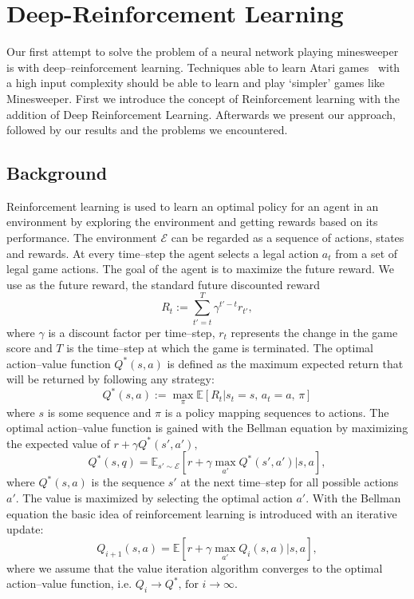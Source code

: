 \chapter{Deep-Reinforcement Learning}
Our first attempt to solve the problem of a neural network playing minesweeper is with deep--reinforcement learning.
Techniques able to learn Atari games~\cite{mnih2013playing} with a high input complexity should be able to learn and play `simpler' games like Minesweeper.
First we introduce the concept of Reinforcement learning with the addition of Deep Reinforcement Learning.
Afterwards we present our approach, followed by our results and the problems we encountered.

\section{Background}
Reinforcement learning is used to learn an optimal policy for an agent in an environment by exploring the environment and getting rewards based on its performance.
The environment $\mathcal{E}$ can be regarded as a sequence of actions, states and rewards.
At every time--step the agent selects a legal action $a_t$ from a set of legal game actions. 
The goal of the agent is to maximize the future reward.
We use as the future reward, the standard future discounted reward
\begin{equation}
R_t := \sum_{t'=t}^T \gamma^{t'-t}r_{t'},
\end{equation}
where $\gamma$ is a discount factor per time--step, $r_t$ represents the change in the game score and $T$ is the time--step at which the game is terminated.
The optimal action--value function $Q^*\left(s,a\right)$ is defined as the maximum expected return that will be returned by following any strategy:
\begin{equation}
Q^*\left(s,a\right):= \max_\pi \mathbb{E} \left[ R_t|s_t=s\text{, }a_t=a\text{, } \pi\right]
\end{equation}
where $s$ is some sequence and $\pi$ is a policy mapping sequences to actions.
The optimal action--value function is gained with the Bellman equation by maximizing the expected value of $r+\gamma Q^*\left(s',a'\right),$
\begin{equation}
Q^*\left(s,q\right)= \mathbb{E}_{s' \sim \mathcal{E}} \left[ r + \gamma \max_{a'} Q^*\left(s',a'\right)| s,a \right],
\end{equation}
where $Q^*\left(s,a\right)$ is the sequence $s'$ at the next time--step for all possible actions $a'$. 
The value is maximized by selecting the optimal action $a'$.
With the Bellman equation the basic idea of reinforcement learning is introduced with an iterative update:
\begin{equation}
Q_{i+1}\left(s,a\right)= \mathbb{E}\left[r+\gamma \max_{a'} Q_i\left(s,a\right)| s,a\right],
\end{equation} 
where we assume that the value iteration algorithm converges to the optimal action--value function, i.e. $Q_i \rightarrow Q^*\text{, for } i \rightarrow \infty$.

